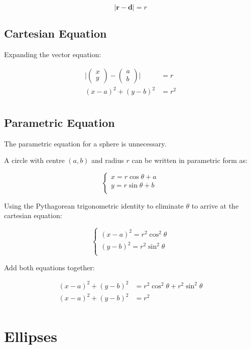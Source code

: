 \documentclass[a4paper,11pt]{report}
\newcommand{\bb}{\boldsymbol}
\begin{document}
$$
\lvert \bb{r} - \bb{d} \rvert = r
$$

\subsection{Cartesian Equation}

Expanding the vector equation:

$$
\begin{aligned}
\lvert \begin{pmatrix} x \\ y \end{pmatrix} - \begin{pmatrix} a \\ b \end{pmatrix} \rvert & = r \\
(x - a)^2 + (y - b)^2 & = r^2 \\
\end{aligned}
$$

\subsection{Parametric Equation}

The parametric equation for a sphere is unnecessary.

A circle with centre $(a, b)$ and radius $r$ can be written in parametric form
as:

$$
\begin{cases}
x = r \cos{\theta} + a \\
y = r \sin{\theta} + b \\
\end{cases}
$$

Using the Pythagorean trigonometric identity to eliminate $\theta$ to arrive at
the cartesian equation:

$$
\begin{cases}
(x - a)^2 = r^2 \cos^2{\theta} \\
(y - b)^2 = r^2 \sin^2{\theta} \\
\end{cases}
$$

Add both equations together:

$$
\begin{aligned}
(x - a)^2 + (y - b)^2 & = r^2 \cos^2{\theta} + r^2 \sin^2{\theta} \\
(x - a)^2 + (y - b)^2 & = r^2 \\
\end{aligned}
$$


\section{Ellipses}
\end{document}
